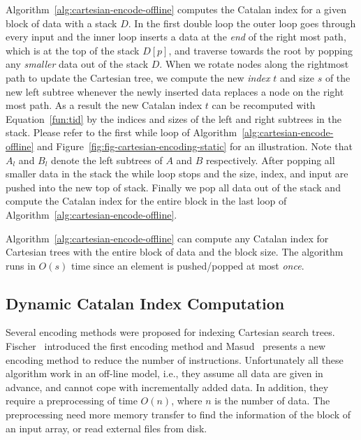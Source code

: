 Algorithm~\ref{alg:cartesian-encode-offline} computes the Catalan
index for a given block of data with a stack $D$.  In the first double
loop the outer loop goes through every input and the inner loop
inserts a data at the {\em end} of the right most path, which is at
the top of the stack $D[p]$, and traverse towards the root by popping
any {\em smaller} data out of the stack $D$.  When we rotate nodes
along the rightmost path to update the Cartesian tree, we compute the
new {\em index} $t$ and size $s$ of the new left subtree whenever the
newly inserted data replaces a node on the right most path.  As a
result the new Catalan index $t$ can be recomputed with
Equation~\ref{fun:tid} by the indices and sizes of the left and right
subtrees in the stack.  Please refer to the first while loop of
Algorithm~\ref{alg:cartesian-encode-offline} and
Figure~\ref{fig:fig-cartesian-encoding-static} for an illustration.
Note that $A_l$ and $B_l$ denote the left subtrees of $A$ and $B$
respectively.  After popping all smaller data in the stack the while
loop stops and the size, index, and input are pushed into the new top
of stack.  Finally we pop all data out of the stack and compute the
Catalan index for the entire block in the last loop of
Algorithm~\ref{alg:cartesian-encode-offline}.

Algorithm~\ref{alg:cartesian-encode-offline} can compute any Catalan
index for Cartesian trees with the entire block of data and the block
size.  The algorithm runs in $O(s)$ time since an element is
pushed/popped at most {\em once}.



\subsection{Dynamic Catalan Index Computation}

Several encoding methods were proposed for indexing Cartesian search
trees.  Fischer~\cite{Fischer2006TheoreticalAP} introduced the first
encoding method and Masud~\cite{Hasan2010CacheOA} presents a new
encoding method to reduce the number of instructions.  Unfortunately
all these algorithm work in an off-line model, i.e., they assume all
data are given in advance, and cannot cope with incrementally added
data.  In addition, they require a preprocessing of time $O(n)$, where
$n$ is the number of data.  The preprocessing need more memory
transfer to find the information of the block of an input array, or
read external files from disk.

